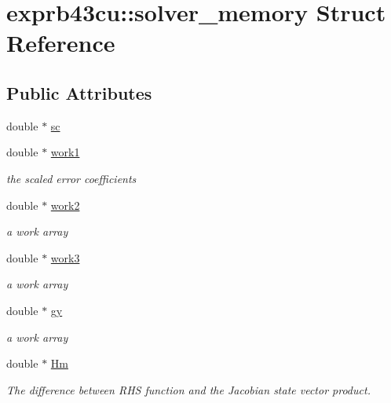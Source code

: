 \hypertarget{structexprb43cu_1_1solver__memory}{}\section{exprb43cu\+:\+:solver\+\_\+memory Struct Reference}
\label{structexprb43cu_1_1solver__memory}
\subsection*{Public Attributes}
\begin{DoxyCompactItemize}
\item 
double $\ast$ \hyperlink{structexprb43cu_1_1solver__memory_aff9b454c8a0c5ecef261b359c44db926}{sc}
\item 
double $\ast$ \hyperlink{structexprb43cu_1_1solver__memory_a97191dca9ff8d04d16d37b26fbea4906}{work1}
\begin{DoxyCompactList}\small\item\em the scaled error coefficients \end{DoxyCompactList}\item 
double $\ast$ \hyperlink{structexprb43cu_1_1solver__memory_a9339316b1097345efa3b55832b3d0d1c}{work2}
\begin{DoxyCompactList}\small\item\em a work array \end{DoxyCompactList}\item 
double $\ast$ \hyperlink{structexprb43cu_1_1solver__memory_ae3a2fe062018c4b7f97f039feceeb003}{work3}
\begin{DoxyCompactList}\small\item\em a work array \end{DoxyCompactList}\item 
double $\ast$ \hyperlink{structexprb43cu_1_1solver__memory_a020f6e5fb98c3395373e8098c0b726ee}{gy}
\begin{DoxyCompactList}\small\item\em a work array \end{DoxyCompactList}\item 
double $\ast$ \hyperlink{structexprb43cu_1_1solver__memory_a2ca03f02755ba0786e0460f33542216b}{Hm}
\begin{DoxyCompactList}\small\item\em The difference between R\+HS function and the Jacobian state vector product. \end{DoxyCompactList}\item 

\end{DoxyCompactItemize}
